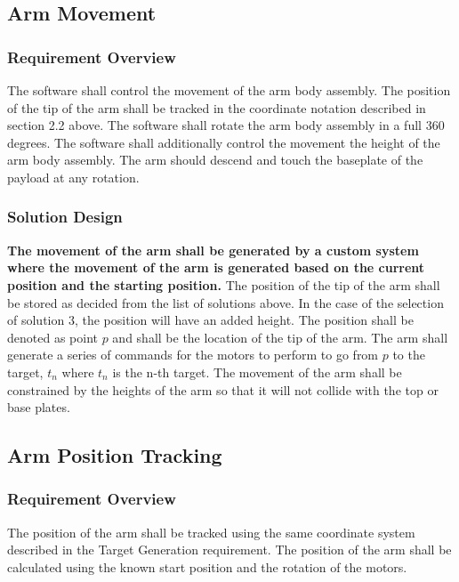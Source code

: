 \documentclass[letterpaper,10pt]{article}
\begin{document}
\subsection{Arm Movement}
\subsubsection{Requirement Overview}
The software shall control the movement of the arm body assembly. 
The position of the tip of the arm shall be tracked in the coordinate notation described in section 2.2 above.
The software shall rotate the arm body assembly in a full 360 degrees.
The software shall additionally control the movement the height of the arm body assembly.
The arm should descend and touch the baseplate of the payload at any rotation.

\subsubsection{Solution Design}
\textbf{The movement of the arm shall be generated by a custom system where the movement of the arm is 
generated based on the current position and the starting position.} 
The position of the tip of the arm shall be stored as decided from the list of solutions above. 
In the case of the selection of solution 3, the position will have an added height. 
The position shall be denoted as point \(p\) and shall be the location of the tip of the arm.
The arm shall generate a series of commands for the motors to perform to go from \(p\) to the target, 
\(t_{n}\) where \(t_{n}\) is the n-th target.
The movement of the arm shall be constrained by the heights of the arm so that it will not collide with 
the top or base plates.

\subsection{Arm Position Tracking}
\subsubsection{Requirement Overview}
The position of the arm shall be tracked using the same coordinate system described in the Target Generation requirement.
The position of the arm shall be calculated using the known start position and the rotation of the motors.
\end{document}
